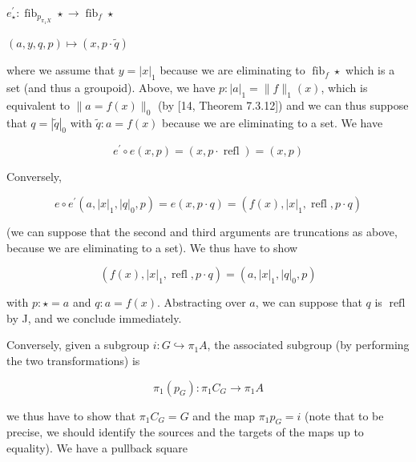 \documentclass[10pt,a4paper]{article}
\begin{document}
\par  \quad  $\displaystyle e^{\prime}_{\star}:\operatorname{fib}_{p_{\pi_{1}X}}\star$\quad  $\displaystyle\to\operatorname{fib}_{f}\star$\quad  \quad  
 
\par  \quad  $\displaystyle(a,y,q,p)$\quad  $\displaystyle\mapsto(x,p\cdot\tilde{q})$\quad  \quad  
  
where we assume that $y=|x|_{1}$ because we are eliminating to $\operatorname{fib}_{f}\star$ which is a set (and thus a groupoid). Above, we have $p:|a|_{1}=\|f\|_{1}(x)$, which is equivalent to $\|a=f(x)\|_{0}$ (by [14, Theorem 7.3.12]) and we can thus suppose that $q=|\tilde{q}|_{0}$ with $\tilde{q}:a=f(x)$ because we are eliminating to a set. We have\par
  
\par  \quad  \[e^{\prime}\circ e(x,p)=(x,p\cdot\operatorname{refl})=(x,p)\]\quad  \quad  
  
Conversely,\par
  
\par  \quad  \[e\circ e^{\prime}(a,|x|_{1},|q|_{0},p)=e(x,p\cdot q)=(f(x),|x|_{1},\operatorname{refl},p\cdot q)\]\quad  \quad  
  
(we can suppose that the second and third arguments are truncations as above, because we are eliminating to a set). We thus have to show\par
  
\par  \quad  \[(f(x),|x|_{1},\operatorname{refl},p\cdot q)=(a,|x|_{1},|q|_{0},p)\]\quad  \quad  
  
with $p:\star=a$ and $q:a=f(x)$. Abstracting over $a$, we can suppose that $q$ is $\operatorname{refl}$ by J, and we conclude immediately.\par
 
 
 
Conversely, given a subgroup $i:G\hookrightarrow\pi_{1}A$, the associated subgroup (by performing the two transformations) is\par
  
\par  \quad  \[\pi_{1}(p_{G}):\pi_{1}C_{G}\to\pi_{1}A\]\quad  \quad  
  
we thus have to show that $\pi_{1}C_{G}=G$ and the map $\pi_{1}p_{G}=i$ (note that to be precise, we should identify the sources and the targets of the maps up to equality). We have a pullback square\par
  
\end{document}

